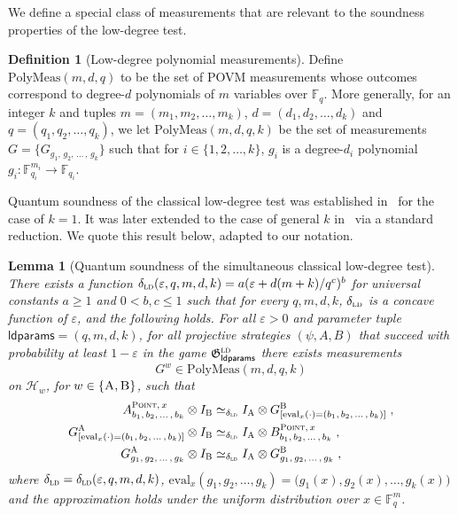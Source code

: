 \documentclass[11pt]{article}
\newtheorem{lemma}[theorem]{Lemma}
\theoremstyle{definition}
\newtheorem{definition}[theorem]{Definition}
\newcommand{\F}{\ensuremath{\mathbb{F}}}
\newcommand{\ld}{\textsc{ld}}
\newcommand{\mH}{\ensuremath{\mathcal{H}}}
\newcommand{\eps}{\varepsilon}
\newcommand{\game}{\mathfrak{G}}
\newcommand{\labelstyle}[1]{\ensuremath{\textsc{#1}}\xspace}
\newcommand{\alice}{\labelstyle{A}}
\newcommand{\bob}{\labelstyle{B}}
\newcommand{\typestyle}[1]{\ensuremath{\textsc{#1}}\xspace}
\newcommand{\Point}{\typestyle{Point}}
\newcommand{\abc}[1][\delta]{\otimes I_\bob \simeq_{#1} I_\alice \otimes}
\newcommand{\ldc}{k} %
\newcommand{\ldparams}{\mathsf{ldparams}}
\newcommand{\polymeas}[3]{\mathrm{PolyMeas}(#1,#2,#3)}
\newcommand{\simulpolymeas}[4]{\mathrm{PolyMeas}(#1,#2,#3, #4)}
\newcommand{\eval}{\mathrm{eval}}
\begin{document}
We define a special class of measurements that are relevant to the soundness
properties of the low-degree test.

\begin{definition}[Low-degree polynomial measurements]
  \label{def:ld-meas}
  Define $\polymeas{m}{d}{q}$ to be the set of POVM measurements whose outcomes
  correspond to degree-$d$ polynomials of $m$ variables over $\F_q$.
  More generally, for an integer $\ldc$ and tuples $m=(m_1, m_2, \ldots,
  m_\ldc)$, $d=(d_1, d_2, \ldots, d_\ldc)$ and $q=(q_1, q_2, \ldots, q_\ldc)$, we
  let $\simulpolymeas{m}{d}{q}{\ldc}$ be the set of measurements $G =
  \{G_{g_1,\, g_2,\, \ldots\,,\, g_\ldc}\}$ such that for $i\in\{1, 2, \ldots,
  \ldc\}$, $g_i$ is a degree-$d_i$ polynomial $g_i:\F_{q_i}^{m_i} \rightarrow
  \F_{q_i}$.
\end{definition}


Quantum soundness of the classical low-degree test was established
in~\cite{natarajan2018low} for the case of $\ldc = 1$.
It was later extended to the case of general $\ldc$ in~\cite[Theorem 4.43]{NW19}
via a standard reduction.
We quote this result below, adapted to our notation. 

\begin{lemma}[Quantum soundness of the simultaneous classical low-degree test]
  \label{lem:ld-soundness}
  There exists a function $\delta_{\ld}(\eps, q, m, d, \ldc) = a (\eps + d(m +
  \ldc) / q^c)^{b}$ for universal constants $a\geq 1$ and $0<b,c\leq 1$ such that for every $q,m,d,\ldc$, $\delta_{\ld}$ is a concave function of $\eps$, and the following
  holds.
  For all $\eps > 0$ and parameter tuple $\ldparams = (q, m, d, \ldc)$, for all
  projective strategies $(\psi,A,B)$ that succeed with probability at least
  $1-\eps$ in the game $\game^\ld_\ldparams$ there exists measurements
  \[G^w \in \simulpolymeas{m}{d}{q}{\ldc}\] on $\mH_w$, for
  $w\in\{\alice,\bob\}$, such that
  \begin{equation*}
    \begin{split}
      A^{\Point,\, x}_{b_1,\, b_2,\, \ldots\,,\, b_\ldc}
      & \abc[\delta_{\ld}]
      G^\bob_{[\eval_x(\cdot) = (b_1,\, b_2,\, \ldots \,,\, b_\ldc)]}\;,\\
      G^\alice_{[\eval_x(\cdot) = (b_1,\, b_2,\, \ldots \,,\, b_\ldc)]}
      & \abc[\delta_{\ld}]
			 B^{\Point,\, x}_{b_1,\, b_2,\, \ldots\,,\, b_\ldc}\;,\\
      G^\alice_{g_1,\, g_2,\, \ldots \,,\, g_\ldc}
      & \abc[\delta_{\ld}]
      G^\bob_{g_1,\, g_2,\, \ldots \,,\, g_\ldc}\;,
    \end{split}
  \end{equation*}
  where $\delta_{\ld} = \delta_{\ld}(\eps, q, m, d, \ldc)$, $\eval_x(g_1, g_2,
  \ldots, g_\ldc) = \bigl(g_1(x), g_2(x), \ldots, g_\ldc(x) \bigr)$ and the
  approximation holds under the uniform distribution over $x\in \F_q^m$.
\end{lemma}
\end{document}
